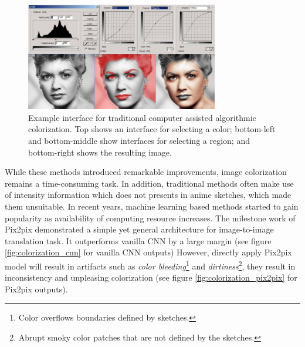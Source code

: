 \begin{figure}
    \centering
    \includegraphics[width=0.75\textwidth]{images/colorization/computer_assisted_colorization.jpg}
    \caption{Example interface for traditional computer assisted algorithmic colorization. Top shows an interface for selecting a color; bottom-left and bottom-middle show interfaces for selecting a region; and bottom-right shows the resulting image.\cite{ColorizeBlackWhite}}
    \label{fig:computer_assisted_colorization}
\end{figure}

While these methods introduced remarkable improvements, image colorization remains a time-consuming task. In addition, traditional methods often make use of intensity information which does not presents in anime sketches, which made them unsuitable. In recent years, machine learning based methods started to gain popularity as availability of computing resource increases. The milestone work of Pix2pix\cite{isolaImagetoImageTranslationConditional2018} demonstrated a simple yet general architecture for image-to-image translation task. It outperforms vanilla CNN by a large margin (see figure \ref{fig:colorization_cnn} for vanilla CNN outputs) However, directly apply Pix2pix model will result in artifacts such as \textit{color bleeding}\footnote{Color overflows boundaries defined by sketches.} and \textit{dirtiness}\footnote{Abrupt smoky color patches that are not defined by the sketches.}, they result in inconsistency and unpleasing colorization (see figure \ref{fig:colorization_pix2pix} for Pix2pix outputs). 

